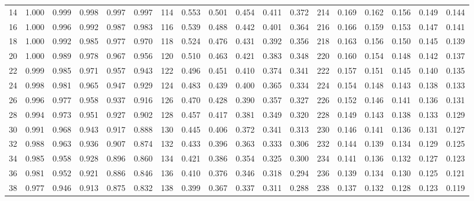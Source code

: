\begin{table}[H]
\begin{tabular}{c|ccccc|c|ccccc|c|ccccc}
	    14      & 1.000 & 0.999 & 0.998 & 0.997 & 0.997 &     114     & 0.553 & 0.501 & 0.454 & 0.411 & 0.372 &     214     & 0.169 & 0.162 & 0.156 & 0.149 & 0.144 \\
	    16      & 1.000 & 0.996 & 0.992 & 0.987 & 0.983 &     116     & 0.539 & 0.488 & 0.442 & 0.401 & 0.364 &     216     & 0.166 & 0.159 & 0.153 & 0.147 & 0.141 \\
	    18      & 1.000 & 0.992 & 0.985 & 0.977 & 0.970 &     118     & 0.524 & 0.476 & 0.431 & 0.392 & 0.356 &     218     & 0.163 & 0.156 & 0.150 & 0.145 & 0.139 \\
	    20      & 1.000 & 0.989 & 0.978 & 0.967 & 0.956 &     120     & 0.510 & 0.463 & 0.421 & 0.383 & 0.348 &     220     & 0.160 & 0.154 & 0.148 & 0.142 & 0.137 \\
	    22      & 0.999 & 0.985 & 0.971 & 0.957 & 0.943 &     122     & 0.496 & 0.451 & 0.410 & 0.374 & 0.341 &     222     & 0.157 & 0.151 & 0.145 & 0.140 & 0.135 \\
	    24      & 0.998 & 0.981 & 0.965 & 0.947 & 0.929 &     124     & 0.483 & 0.439 & 0.400 & 0.365 & 0.334 &     224     & 0.154 & 0.148 & 0.143 & 0.138 & 0.133 \\
	    26      & 0.996 & 0.977 & 0.958 & 0.937 & 0.916 &     126     & 0.470 & 0.428 & 0.390 & 0.357 & 0.327 &     226     & 0.152 & 0.146 & 0.141 & 0.136 & 0.131 \\
	    28      & 0.994 & 0.973 & 0.951 & 0.927 & 0.902 &     128     & 0.457 & 0.417 & 0.381 & 0.349 & 0.320 &     228     & 0.149 & 0.143 & 0.138 & 0.133 & 0.129 \\
	    30      & 0.991 & 0.968 & 0.943 & 0.917 & 0.888 &     130     & 0.445 & 0.406 & 0.372 & 0.341 & 0.313 &     230     & 0.146 & 0.141 & 0.136 & 0.131 & 0.127 \\
	    32      & 0.988 & 0.963 & 0.936 & 0.907 & 0.874 &     132     & 0.433 & 0.396 & 0.363 & 0.333 & 0.306 &     232     & 0.144 & 0.139 & 0.134 & 0.129 & 0.125 \\
	    34      & 0.985 & 0.958 & 0.928 & 0.896 & 0.860 &     134     & 0.421 & 0.386 & 0.354 & 0.325 & 0.300 &     234     & 0.141 & 0.136 & 0.132 & 0.127 & 0.123 \\
	    36      & 0.981 & 0.952 & 0.921 & 0.886 & 0.846 &     136     & 0.410 & 0.376 & 0.346 & 0.318 & 0.294 &     236     & 0.139 & 0.134 & 0.130 & 0.125 & 0.121 \\
	    38      & 0.977 & 0.946 & 0.913 & 0.875 & 0.832 &     138     & 0.399 & 0.367 & 0.337 & 0.311 & 0.288 &     238     & 0.137 & 0.132 & 0.128 & 0.123 & 0.119 \\

\end{tabular}
\end{table}
